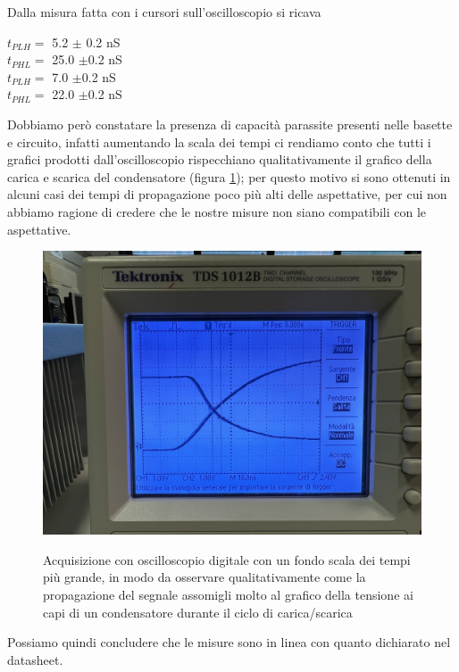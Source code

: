 \documentclass[10pt, a4paper, italian]{article}
\begin{document}
Dalla misura fatta con i cursori sull'oscilloscopio si ricava
\begin{multicols}{2}
    \centering
    $t_{PLH}=$ 5.2 $\pm$ 0.2 nS\\
    $t_{PHL}=$ 25.0 $\pm$0.2 nS\\
    
    
    $t_{PLH}=$ 7.0 $\pm$0.2 nS\\
    $t_{PHL}=$ 22.0 $\pm$0.2 nS\\
\end{multicols}
Dobbiamo però constatare la presenza di capacità parassite presenti nelle basette e circuito, infatti aumentando la scala dei tempi ci rendiamo conto che tutti i grafici prodotti dall'oscilloscopio rispecchiano qualitativamente il grafico della carica e scarica del condensatore (figura \cref{fig: carica}); per questo motivo si sono ottenuti in alcuni casi dei tempi di propagazione poco più alti delle aspettative, per cui non abbiamo ragione di credere che le nostre misure non siano compatibili con le aspettative.
\begin{figure}
	\includegraphics[width=\textwidth]{carica}
	\label{fig: carica}
	\caption{Acquisizione con oscilloscopio digitale con un fondo scala dei tempi più grande, in modo da osservare qualitativamente come la propagazione del segnale assomigli molto al grafico della tensione ai capi di un condensatore durante il ciclo di carica/scarica}
\end{figure}
Possiamo quindi concludere che le misure sono in linea con quanto dichiarato nel datasheet.

\setcounter{section}{3}
\end{document}

